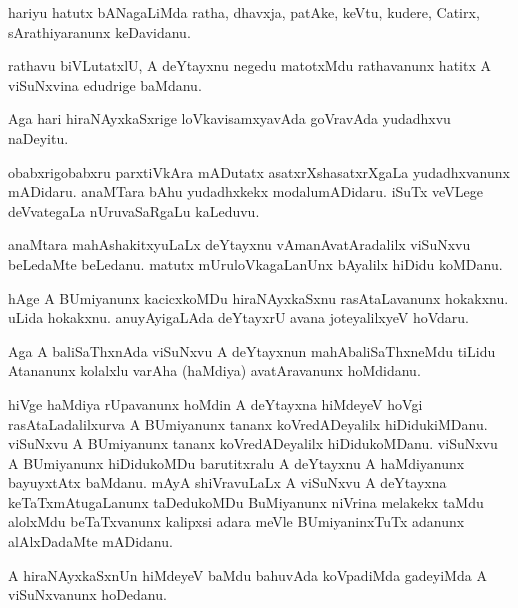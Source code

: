 \documentclass{article}
\begin{document}
\begin{mng}%
hariyu hatutx bANagaLiMda ratha, dhavxja, patAke, keVtu, kudere, Catirx, sArathiyaranunx keDavidanu.
\end{mng}

\begin{mng}%
rathavu biVLutatxlU, A deYtayxnu negedu matotxMdu rathavanunx hatitx A viSuNxvina edudrige baMdanu.
\end{mng}

\begin{mng}%
Aga hari hiraNAyxkaSxrige loVkavisamxyavAda goVravAda yudadhxvu naDeyitu.
\end{mng}

\begin{mng}%
obabxrigobabxru parxtiVkAra mADutatx asatxrXshasatxrXgaLa yudadhxvanunx mADidaru. anaMTara bAhu 
yudadhxkekx modalumADidaru. iSuTx veVLege deVvategaLa nUruvaSaRgaLu kaLeduvu.
\end{mng}

\begin{mng}%
anaMtara mahAshakitxyuLaLx deYtayxnu vAmanAvatAradalilx viSuNxvu beLedaMte beLedanu. matutx 
mUruloVkagaLanUnx bAyalilx hiDidu koMDanu.
\end{mng}

\begin{mng}%
hAge A BUmiyanunx kacicxkoMDu hiraNAyxkaSxnu rasAtaLavanunx hokakxnu. uLida hokakxnu. anuyAyigaLAda 
deYtayxrU avana joteyalilxyeV hoVdaru.
\end{mng}

\begin{mng}%
Aga A baliSaThxnAda viSuNxvu A deYtayxnun mahAbaliSaThxneMdu tiLidu Atananunx kolalxlu varAha 
(haMdiya) avatAravanunx hoMdidanu.
\end{mng}

\begin{mng}%
hiVge haMdiya rUpavanunx hoMdin A deYtayxna hiMdeyeV hoVgi rasAtaLadalilxurva A BUmiyanunx tananx 
koVredADeyalilx hiDidukiMDanu. viSuNxvu A BUmiyanunx tananx koVredADeyalilx hiDidukoMDanu. viSuNxvu 
A BUmiyanunx hiDidukoMDu barutitxralu A deYtayxnu A haMdiyanunx bayuyxtAtx baMdanu. mAyA 
shiVravuLaLx A viSuNxvu A deYtayxna keTaTxmAtugaLanunx taDedukoMDu BuMiyanunx niVrina melakekx 
taMdu alolxMdu beTaTxvanunx kalipxsi adara meVle BUmiyaninxTuTx adanunx alAlxDadaMte mADidanu.
\end{mng}

\begin{mng}%
A hiraNAyxkaSxnUn hiMdeyeV baMdu bahuvAda koVpadiMda gadeyiMda A viSuNxvanunx hoDedanu.
\end{mng}
\end{document}
